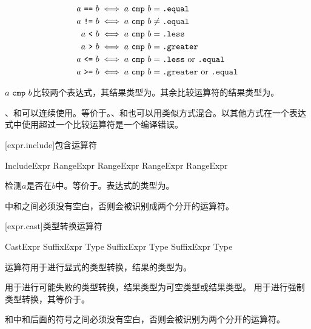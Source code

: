\begin{align*}
a\ \tcode{==}\ b &\iff a\ \tcode{cmp}\ b = \tcode{.equal} \\
a\ \tcode{!=}\ b &\iff a\ \tcode{cmp}\ b \ne \tcode{.equal} \\
a\ \tcode{<}\ b &\iff a\ \tcode{cmp}\ b = \tcode{.less} \\
a\ \tcode{>}\ b &\iff a\ \tcode{cmp}\ b = \tcode{.greater} \\
a\ \tcode{<=}\ b &\iff a\ \tcode{cmp}\ b = \tcode{.less}\ \mathrm{or} \ \tcode{.equal} \\
a\ \tcode{>=}\ b &\iff a\ \tcode{cmp}\ b = \tcode{.greater}\ \mathrm{or} \ \tcode{.equal} \\
\end{align*}

\pnum
$a\ \tcode{cmp}\ b$比较两个表达式，其结果类型为。其余比较运算符的结果类型为。

\pnum
\tcode{<}、\tcode{<=}和\tcode{==}可以连续使用。等价于。\tcode{>}、\tcode{>=}和\tcode{==}也可以用类似方式混合。以其他方式在一个表达式中使用超过一个比较运算符是一个编译错误。

[expr.include]{包含运算符}

\begin{bnf}{IncludeExpr}
    RangeExpr  RangeExpr \br
    RangeExpr  RangeExpr
\end{bnf}

\pnum
{}检测$a$是否在$b$中。等价于。表达式的类型为。

\pnum
\enternote {}中\tcode{!}和之间必须没有空白，否则会被识别成两个分开的运算符。\exitnote

[expr.cast]{类型转换运算符}

\begin{bnf}{CastExpr}
    SuffixExpr  Type \br
    SuffixExpr  Type \br
    SuffixExpr  Type
\end{bnf}

\pnum
{}运算符用于进行显式的类型转换，结果的类型为。

\pnum
{}用于进行可能失败的类型转换，结果类型为可空类型或结果类型。
用于进行强制类型转换，其等价于。

\pnum
\enternote {}和中和后面的符号之间必须没有空白，否则会被识别为两个分开的运算符。\exitnote

